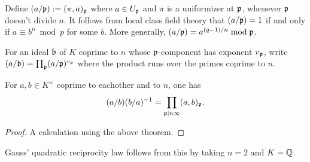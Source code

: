 Define $(a/\mathfrak{p}) := (\pi,a)_{\mathfrak{p}}$ where $a \in U_{\mathfrak{p}}$ and $\pi$ is a uniformizer at $\mathfrak{p}$, whenever $\mathfrak{p}$ doesn't divide $n$.
It follows from local class field theory that $(a/\mathfrak{p}) = 1$ if and only if $a \equiv b^{n} \bmod p$ for some $b$.
More generally, $(a/\mathfrak{p}) = a^{(q-1)/n} \bmod \mathfrak{p}$.

For an ideal $\mathfrak{b}$ of $K$ coprime to $n$ whose $\mathfrak{p}$-component has exponent $v_{\mathfrak{p}}$, write $(a/\mathfrak{b}) = \prod_{\mathfrak{p}} (a/\mathfrak{p})^{v_{\mathfrak{p}}}$ where the product runs over the primes coprime to $n$.

\begin{theorem}
  For $a,b \in K^{\times}$ coprime to eachother and to $n$, one has
  \[ (a/b)(b/a)^{-1} = \prod_{\mathfrak{p}|n\infty}(a,b)_{\mathfrak{p}}. \]
\end{theorem}
\begin{proof}
  A calculation using the above theorem.
\end{proof}
Gauss' quadratic reciprocity law follows from this by taking $n = 2$ and $K = \mathbb{Q}$.

